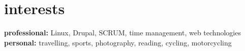 \documentclass[]{friggeri-cv} %
\begin{document}


\section{interests}

\textbf{professional:} Linux, Drupal, SCRUM, time management, web technologies \\
\textbf{personal:} travelling, sports, photography, reading, cycling, motorcycling
\end{document}
